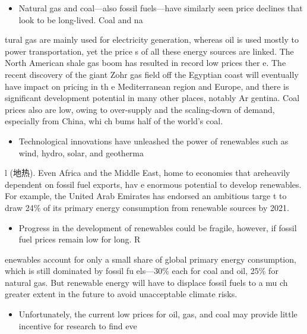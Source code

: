 \documentclass[UTF8,11pt]{ctexart}
\begin{document}
\begin{itemize}[leftmargin=2em,itemsep=.2em,topsep=.4em]\item[E.] Natural gas and coal—also fossil fuels—have similarly seen price declines that look to be long-lived. Coal and na
\end{itemize}

tural gas are mainly used for electricity generation, whereas oil is used mostly to power transportation, yet the price s of all these energy sources are linked. The North American shale gas boom has resulted in record low prices ther e. The recent discovery of the giant Zohr gas field off the Egyptian coast will eventually have impact on pricing in th e Mediterranean region and Europe, and there is significant development potential in many other places, notably Ar gentina. Coal prices also are low, owing to over-supply and the scaling-down of demand, especially from China, whi ch bums half of the world's coal.


\begin{itemize}[leftmargin=2em,itemsep=.2em,topsep=.4em]\item[F.] Technological innovations have unleashed the power of renewables such as wind, hydro, solar, and geotherma
\end{itemize}

l (地热). Even Africa and the Middle East, home to economies that areheavily dependent on fossil fuel exports, hav e enormous potential to develop renewables. For example, the United Arab Emirates has endorsed an ambitious targe t to draw 24\% of its primary energy consumption from renewable sources by 2021.


\begin{itemize}[leftmargin=2em,itemsep=.2em,topsep=.4em]\item[G.] Progress in the development of renewables could be fragile, however, if fossil fuel prices remain low for long. R
\end{itemize}

enewables account for only a small share of global primary energy consumption, which is still dominated by fossil fu els—30\% each for coal and oil, 25\% for natural gas. But renewable energy will have to displace fossil fuels to a mu ch greater extent in the future to avoid unacceptable climate risks.


\begin{itemize}[leftmargin=2em,itemsep=.2em,topsep=.4em]\item[H.] Unfortunately, the current low prices for oil, gas, and coal may provide little incentive for research to find eve
\end{itemize}
\end{document}
